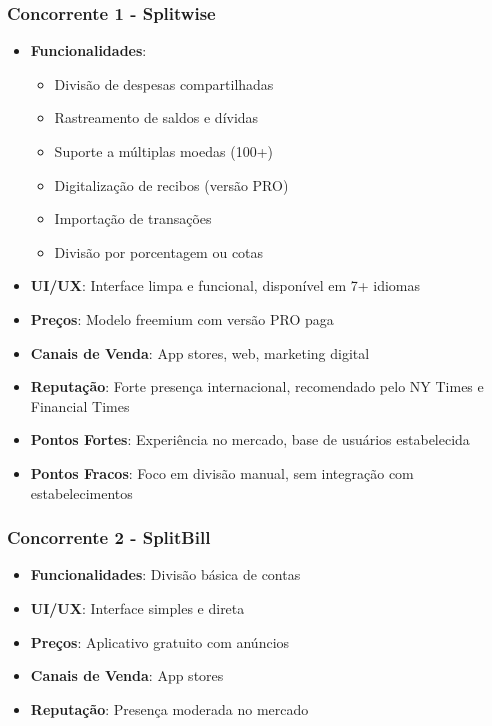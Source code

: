 \documentclass[12pt,a4paper]{article}
\begin{document}
\subsubsection{Concorrente 1 - Splitwise}
\begin{itemize}
    \item \textbf{Funcionalidades}: 
        \begin{itemize}
            \item Divisão de despesas compartilhadas
            \item Rastreamento de saldos e dívidas
            \item Suporte a múltiplas moedas (100+)
            \item Digitalização de recibos (versão PRO)
            \item Importação de transações
            \item Divisão por porcentagem ou cotas
        \end{itemize}
    \item \textbf{UI/UX}: Interface limpa e funcional, disponível em 7+ idiomas
    \item \textbf{Preços}: Modelo freemium com versão PRO paga
    \item \textbf{Canais de Venda}: App stores, web, marketing digital
    \item \textbf{Reputação}: Forte presença internacional, recomendado pelo NY Times e Financial Times
    \item \textbf{Pontos Fortes}: Experiência no mercado, base de usuários estabelecida
    \item \textbf{Pontos Fracos}: Foco em divisão manual, sem integração com estabelecimentos
\end{itemize}

\subsubsection{Concorrente 2 - SplitBill}
\begin{itemize}
    \item \textbf{Funcionalidades}: Divisão básica de contas
    \item \textbf{UI/UX}: Interface simples e direta
    \item \textbf{Preços}: Aplicativo gratuito com anúncios
    \item \textbf{Canais de Venda}: App stores
    \item \textbf{Reputação}: Presença moderada no mercado
\end{itemize}
\end{document}
